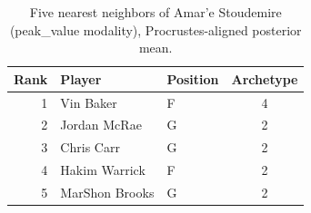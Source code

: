 \begin{table}[htbp]
  \centering\small
  \begin{tabular}{rllc}
    \toprule
    Rank & Player & Position & Archetype \\
    \midrule
    1 & Vin Baker & F & 4 \\
    2 & Jordan McRae & G & 2 \\
    3 & Chris Carr & G & 2 \\
    4 & Hakim Warrick & F & 2 \\
    5 & MarShon Brooks & G & 2 \\
    \bottomrule
  \end{tabular}
  \caption{Five nearest neighbors of Amar'e Stoudemire (peak_value modality), Procrustes-aligned posterior mean.}
  \label{tab:Amar_e_Stoudemire_neighbors_peak_value}
\end{table}

